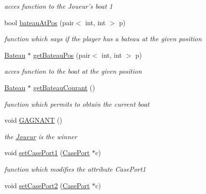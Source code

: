 \begin{DoxyCompactItemize}
\begin{DoxyCompactList}\small\item\em acces function to the Joueur's boat 1 \item\end{DoxyCompactList}\item 
bool \hyperlink{class_joueur_a5654719eb79051c72eee0a289441e5be}{bateauAtPos} (pair$<$ int, int $>$ p)
\begin{DoxyCompactList}\small\item\em function which says if the player has a bateau at the given position \item\end{DoxyCompactList}\item 
\hyperlink{class_bateau}{Bateau} $\ast$ \hyperlink{class_joueur_a744f60bbbf845f96cf9d57234be0eb7b}{getBateauPos} (pair$<$ int, int $>$ p)
\begin{DoxyCompactList}\small\item\em acces function to the boat at the given position \item\end{DoxyCompactList}\item 
\hyperlink{class_bateau}{Bateau} $\ast$ \hyperlink{class_joueur_ab1bed142a18ffce2b6f4edc3a5076212}{getBateauCourant} ()
\begin{DoxyCompactList}\small\item\em function which permits to obtain the current boat \item\end{DoxyCompactList}\item 
\hypertarget{class_joueur_a79c22fd4d58254ef510767d5a0ca27c4}{
void \hyperlink{class_joueur_a79c22fd4d58254ef510767d5a0ca27c4}{GAGNANT} ()}
\label{class_joueur_a79c22fd4d58254ef510767d5a0ca27c4}

\begin{DoxyCompactList}\small\item\em the \hyperlink{class_joueur}{Joueur} is the winner \item\end{DoxyCompactList}\item 
\hypertarget{class_joueur_aa74ba50e1a23e92bf598b4e2ab02b4c7}{
void \hyperlink{class_joueur_aa74ba50e1a23e92bf598b4e2ab02b4c7}{setCasePort1} (\hyperlink{class_case_port}{CasePort} $\ast$c)}
\label{class_joueur_aa74ba50e1a23e92bf598b4e2ab02b4c7}

\begin{DoxyCompactList}\small\item\em function which modifies the attribute CasePort1 \item\end{DoxyCompactList}\item 
\hypertarget{class_joueur_ae96bb26f6293ccaaa84ea69816ef00ba}{
void \hyperlink{class_joueur_ae96bb26f6293ccaaa84ea69816ef00ba}{setCasePort2} (\hyperlink{class_case_port}{CasePort} $\ast$c)}
\label{class_joueur_ae96bb26f6293ccaaa84ea69816ef00ba}


\end{DoxyCompactItemize}
